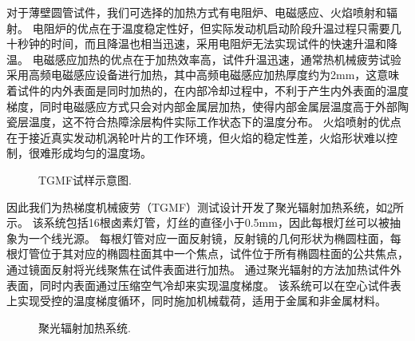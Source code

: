 \documentclass{article}
\begin{document}
对于薄壁圆管试件，我们可选择的加热方式有电阻炉、电磁感应、火焰喷射和辐射。
电阻炉的优点在于温度稳定性好，但实际发动机启动阶段升温过程只需要几十秒钟的时间，而且降温也相当迅速，采用电阻炉无法实现试件的快速升温和降温。
电磁感应加热的优点在于加热效率高，试件升温迅速，通常热机械疲劳试验采用高频电磁感应设备进行加热，其中高频电磁感应加热厚度约为2mm，这意味着试件的内外表面是同时加热的，在内部冷却过程中，不利于产生内外表面的温度梯度，同时电磁感应方式只会对内部金属层加热，使得内部金属层温度高于外部陶瓷层温度，这不符合热障涂层构件实际工作状态下的温度分布。
火焰喷射的优点在于接近真实发动机涡轮叶片的工作环境，但火焰的稳定性差，火焰形状难以控制，很难形成均匀的温度场。

\begin{figure}[!htp]
\caption{TGMF试样示意图.}
\label{Fig:Specimen}
\end{figure}

因此我们为热梯度机械疲劳（TGMF）测试设计开发了聚光辐射加热系统，如\ref{Fig:Radiation_Furnace2}所示。
该系统包括16根卤素灯管，灯丝的直径小于0.5mm，因此每根灯丝可以被抽象为一个线光源。
每根灯管对应一面反射镜，反射镜的几何形状为椭圆柱面，每根灯管位于其对应的椭圆柱面其中一个焦点，试件位于所有椭圆柱面的公共焦点，通过镜面反射将光线聚焦在试件表面进行加热。
通过聚光辐射的方法加热试件外表面，同时内表面通过压缩空气冷却来实现温度梯度。
该系统可以在空心试件表上实现受控的温度梯度循环，同时施加机械载荷，适用于金属和非金属材料。

\begin{figure}[!htp]
\caption{聚光辐射加热系统.}
\label{Fig:Radiation_Furnace2}
\end{figure}
\end{document}
